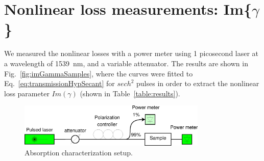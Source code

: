 \documentclass[10pt,letterpaper]{article}
\begin{document}

\section{Nonlinear loss measurements: Im\{$ \gamma $\}}

We measured the nonlinear losses with a power meter using 1 picosecond laser at a wavelength of 1539~nm, and a variable attenuator. The results are shown in Fig.~\ref{fig:imGammaSamples}, where the curves were fitted to Eq.~\ref{eq:transmissionHypSecant} for $sech^2$ pulses in order to extract the nonlinear loss parameter $Im(\gamma)$ (shown in Table~\ref{table:results}).




\begin{figure}[htb]
    \centering
    \includegraphics[width=0.80\textwidth]{imGammaFit}
    \caption{Absorption characterization setup.}
    \label{fig:imGammaSetup}
\end{figure}
\end{document}

